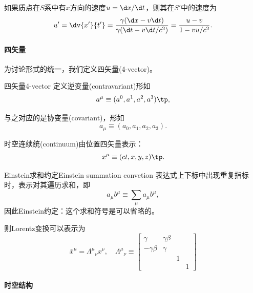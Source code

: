 如果质点在$S$系中有$x$方向的速度$u=\d x/\d t$，则其在$S'$中的速度为
\begin{equation}
    u'=\dv{x'}{t'}=\frac{\gamma(\d x-v\d t)}{\gamma(\d t-v\d t/c^2)}=\frac{u-v}{1-vu/c^2}.
\end{equation}

\paragraph{四矢量}

为讨论形式的统一，我们定义四矢量(4-vector)。

\begin{definition}{四矢量}{4-vector}
    定义逆变量(contravariant)形如
    \begin{equation}
        a^\mu\equiv(a^0,a^1,a^2,a^3)\tp,
    \end{equation}

    与之对应的是协变量(covariant)，形如
    \begin{equation}
        a_\mu\equiv(a_0,a_1,a_2,a_3).
    \end{equation}
\end{definition}
时空连续统(continuum)由位置四矢量表示：
\begin{equation}
    x^\mu\equiv(ct,x,y,z)\tp.
\end{equation}
\begin{definition}{Einstein求和约定}{Einstein summation convetion}
    表达式上下标中出现重复指标时，表示对其遍历求和，即
    \begin{equation}
        a_\mu b^\mu\equiv\sum_\mu a_\mu b^\mu,
    \end{equation}
    因此Einstein约定：这个求和符号是可以省略的。
\end{definition}
则Lorentz变换可以表示为
\[
    \bar x^\mu=\Lambda^\mu{}_\nu x^\nu,\quad\Lambda^\mu{}_\nu\equiv
    \begin{bmatrix}
		\gamma&\gamma\beta\\-\gamma\beta&\gamma\\ &&1\\ &&&1
	\end{bmatrix}
\]

\paragraph{时空结构}

